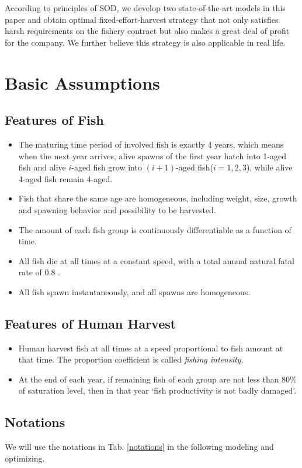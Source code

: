\documentclass{IEEEtran}
\begin{document}
According to principles of SOD, we develop two state-of-the-art models in this paper and obtain optimal fixed-effort-harvest strategy that not only satisfies harsh requirements on the fishery contract but also makes a great deal of profit for the company. We further believe this strategy is also applicable in real life. 

\section{Basic Assumptions}
\subsection{Features of Fish}
\begin{itemize}
\item {The maturing time period of involved fish is exactly 4 years, which means when the next year arrives, alive spawns of the first year hatch into 1-aged fish and alive $i$-aged fish grow into $(i+1)$-aged fish($i=1,2,3$), while alive 4-aged fish remain 4-aged.}
\item {Fish that share the same age are homogeneous, including weight, size, growth and spawning behavior and possibility to be harvested.}
\item {The amount of each fish group is continuously differentiable as a function of time.}
\item {All fish die at all times at a constant speed, with a total annual natural fatal rate of 0.8 .}
\item {All fish spawn instantaneously, and all spawns are homogeneous. }
\end{itemize}

\subsection{Features of Human Harvest}
\begin{itemize}
\item {Human harvest fish at all times at a speed proportional to fish amount at that time. The proportion coefficient is called \textit{fishing intensity}.}
\item {At the end of each year, if remaining fish of each group are not less than 80\% of saturation level, then in that year `fish productivity is not badly damaged'.}
\end{itemize}

\subsection{Notations}
We will use the notations in Tab. \ref{notations} in the following modeling and optimizing.
\end{document}
